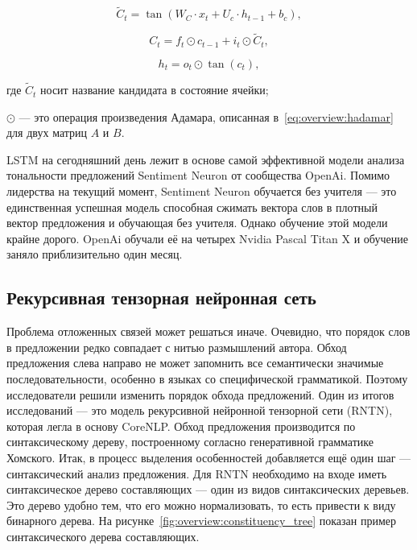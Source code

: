 \begin{equation}
  \label{eq:overview:lstm:cell_candidate}
  \tilde{C}_t = \tan(W_{C}\cdot{x_{t}} + U_{c}\cdot{h_{t-1}} + b_c),
\end{equation}

\begin{equation}
  \label{eq:overview:lstm:new_cell}
  C_t = f_t\odot{c_{t-1}} + i_t\odot{\tilde{C}_t},
\end{equation}

\begin{equation}
  \label{eq:overview:lstm:new_hidden}
  h_t = o_t\odot{\tan(c_t)},
\end{equation}
\begin{explanationx}
\item [где] $\tilde{C}_t$ носит название кандидата в состояние ячейки;
\item ${\odot}$ --- это операция произведения Адамара, описанная в~\ref{eq:overview:hadamar} для двух матриц $A$ и $B$.
\end{explanationx}

LSTM на сегодняшний день лежит в основе самой эффективной модели анализа тональности предложений Sentiment Neuron от сообщества OpenAi. Помимо лидерства на текущий момент, Sentiment Neuron обучается без учителя --- это единственная успешная модель способная сжимать вектора слов в плотный вектор предложения и обучающая без учителя. Однако обучение этой модели крайне дорого. OpenAi обучали её на четырех Nvidia Pascal Titan X и обучение заняло приблизительно один месяц\cite{openai}.

\subsection{Рекурсивная тензорная нейронная сеть}
Проблема отложенных связей может решаться иначе. Очевидно, что порядок слов в предложении редко совпадает с нитью размышлений автора. Обход предложения слева направо не может запомнить все семантически значимые последовательности, особенно в языках со специфической грамматикой. Поэтому исследователи решили изменить порядок обхода предложений. Один из итогов исследований --- это модель рекурсивной нейронной тензорной сети (RNTN), которая легла в основу CoreNLP\@. Обход предложения производится по синтаксическому дереву, построенному согласно генеративной грамматике Хомского\cite{Chomsky}.
Итак, в процесс выделения особенностей добавляется ещё один шаг --- синтаксический анализ предложения. Для RNTN необходимо на входе иметь синтаксическое дерево составляющих --- один из видов синтаксических деревьев. Это дерево удобно тем, что его можно нормализовать, то есть привести к виду бинарного дерева. На рисунке~\ref{fig:overview:constituency_tree} показан пример синтаксического дерева составляющих\cite{Chomsky}.

